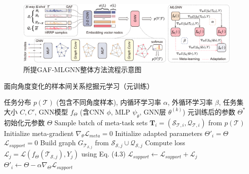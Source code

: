 \begin{figure}[h]
    \centering
    \includegraphics[width=\linewidth]{figures/method2.pdf}
    \caption{所提GAF-MLGNN整体方法流程示意图}
    \label{fig:method_chap3}
\end{figure}

\begin{algorithm}[htbp]
\caption{面向角度变化的样本间关系挖掘元学习（元训练）}
\label{alg:meta_training_angle}
\begin{algorithmic}[1]
    \REQUIRE 任务分布 $p(\mathcal{T})$ (包含不同角度样本), 内循环学习率 $\alpha$, 外循环学习率 $\beta$, 任务集大小 $C, C'$, GNN模型 $f_\Theta$ (含CNN $\phi$, MLP $\psi_{\tilde{\theta}}$, GNN层 $\theta^{(k)}$)
    \ENSURE 元训练后的参数 $\Theta^*$
    \STATE 初始化元参数 $\Theta$
        \STATE Sample batch of meta-task sets $\mathbf{T}_i = (\mathcal{S}_{\mathcal{T},i}, \mathcal{Q}_{\mathcal{T},i})$ from $p(\mathcal{T})$
        \STATE Initialize meta-gradient $\nabla_\theta \mathcal{L}_{meta} = 0$
            \STATE Initialize adapted parameters $\Theta'_i = \Theta$
            \STATE $\mathcal{L}_{support} = 0$
               \STATE Build graph $G_{\mathcal{T}_{\mathcal{S},j}}$ from $\mathcal{S}_{\mathcal{S},j} \cup \mathcal{Q}_{\mathcal{S},j}$
               \STATE Compute loss $\mathcal{L}_j = \mathcal{L}(f_{\Theta}(\mathcal{T}_{\mathcal{S},j}), Y_j)$ using Eq. (4.3)
               \STATE $\mathcal{L}_{support} \leftarrow \mathcal{L}_{support} + \mathcal{L}_j$
            \ENDFOR
            \STATE $\Theta'_i \leftarrow \Theta - \alpha \nabla_{\Theta} \mathcal{L}_{support}$ %


\end{algorithmic}
\end{algorithm}
